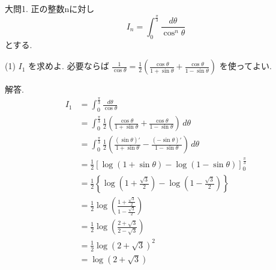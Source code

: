 \documentclass{jarticle}
\begin{document}
大問1. 正の整数nに対し
\begin{equation*}
 I_n = \int^{\frac{\pi}{3}}_{0} \frac{d\theta}{\cos^n\theta}
\end{equation*}
とする. \par
(1) $I_1$ を求めよ. 必要ならば $\frac{1}{\cos\theta} = \frac{1}{2}\left(\frac{\cos\theta}{1+\sin\theta}+\frac{\cos\theta}{1-\sin\theta}\right)$ を使ってよい.  \par
解答. 
\begin{align*}
 I_1 &= \int^{\frac{\pi}{3}}_{0} \frac{d\theta}{\cos\theta} \\
     &= \int^{\frac{\pi}{3}}_{0}  \frac{1}{2}\left(\frac{\cos\theta}{1+\sin\theta}+\frac{\cos\theta}{1-\sin\theta}\right) \, d\theta \\
     &= \int^{\frac{\pi}{3}}_{0} \frac{1}{2}\left(\frac{(\sin\theta)'}{1+\sin\theta}-\frac{(-\sin\theta)'}{1-\sin\theta}\right) \, d\theta \\
     &= \frac{1}{2} \left[\log(1+\sin\theta) - \log(1-\sin\theta)\right]^{\frac{\pi}{3}}_{0} \\
     &= \frac{1}{2} \left\{ \log\left(1+\frac{\sqrt{3}}{2}\right) - \log\left(1-\frac{\sqrt{3}}{2}\right)\right\} \\
     &= \frac{1}{2} \log\left(\frac{1+\frac{\sqrt{3}}{2}}{1-\frac{\sqrt{3}}{2}}\right) \\
     &= \frac{1}{2} \log\left(\frac{2+\sqrt{3}}{2-\sqrt{3}}\right) \\
     &= \frac{1}{2} \log(2+\sqrt{3})^2 \\
     &= \log(2+\sqrt{3}) \\
\end{align*}
\end{document}
